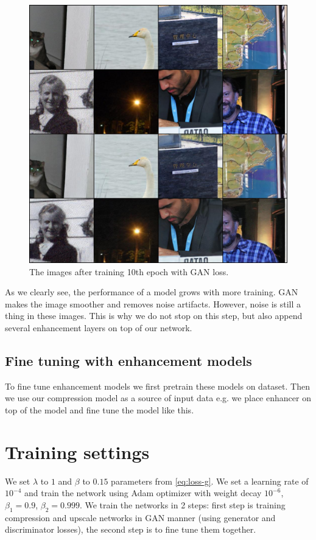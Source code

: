 \begin{figure}
    \centering
    \includegraphics[width=\textwidth]{figure/gan_14000.jpg}
    \caption{The images after training 10th epoch with GAN loss.}
    \label{gan-tenth-epoch}
\end{figure}

As we clearly see, the performance of a model grows with more training. GAN makes the image smoother and removes noise artifacts. However, noise is still a thing in these images. This is why we do not stop on this step, but also append several enhancement layers on top of our network.

\subsection{Fine tuning with enhancement models}

To fine tune enhancement models we first pretrain these models on dataset. Then we use our compression model as a source of input data e.g. we place enhancer on top of the model and fine tune the model like this.

\section{Training settings}

We set $\lambda$ to $1$ and $\beta$ to $0.15$ parameters from \ref{eq:loss-g}. We set a learning rate of $10^{-4}$ and train the network using Adam optimizer \cite{kingma_adam_2017} with weight decay $10^{-6}$, $\beta_1 = 0.9$, $\beta_2 = 0.999$. We train the networks in 2 steps: first step is training compression and upscale networks in GAN manner (using generator and discriminator losses), the second step is to fine tune them together.

